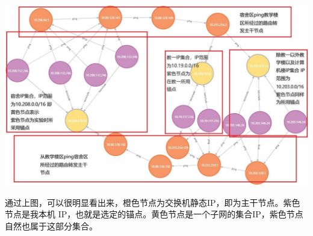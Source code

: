 \documentclass{article} %
\begin{document}
        \includegraphics[scale=0.6]{pic/东南大学网络拓扑图说明.jpg}
        \par 通过上图，可以很明显看出来，橙色节点为交换机静态IP，即为主干节点。紫色节点是我本机
        IP，也就是选定的锚点。黄色节点是一个子网的集合IP，紫色节点自然也属于这部分集合。
\end{document}
